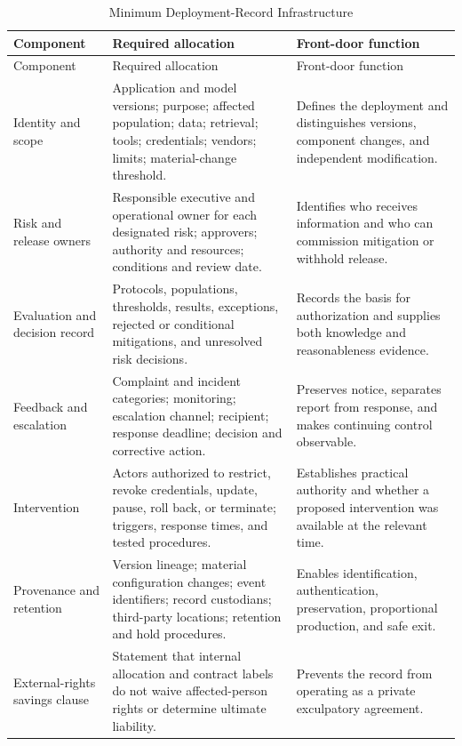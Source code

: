 \begin{longtable}{>{\raggedright\arraybackslash}p{} >{\raggedright\arraybackslash}p{} >{\raggedright\arraybackslash}p{}}
\caption{Minimum Deployment-Record Infrastructure}\label{tab:control-sheet}\\
\toprule
Component & Required allocation & Front-door function \\
\midrule
\endfirsthead
\toprule
Component & Required allocation & Front-door function \\
\midrule
\endhead
Identity and scope & Application and model versions; purpose; affected population; data; retrieval; tools; credentials; vendors; limits; material-change threshold. & Defines the deployment and distinguishes versions, component changes, and independent modification. \\
Risk and release owners & Responsible executive and operational owner for each designated risk; approvers; authority and resources; conditions and review date. & Identifies who receives information and who can commission mitigation or withhold release. \\
Evaluation and decision record & Protocols, populations, thresholds, results, exceptions, rejected or conditional mitigations, and unresolved risk decisions. & Records the basis for authorization and supplies both knowledge and reasonableness evidence. \\
Feedback and escalation & Complaint and incident categories; monitoring; escalation channel; recipient; response deadline; decision and corrective action. & Preserves notice, separates report from response, and makes continuing control observable. \\
Intervention & Actors authorized to restrict, revoke credentials, update, pause, roll back, or terminate; triggers, response times, and tested procedures. & Establishes practical authority and whether a proposed intervention was available at the relevant time. \\
Provenance and retention & Version lineage; material configuration changes; event identifiers; record custodians; third-party locations; retention and hold procedures. & Enables identification, authentication, preservation, proportional production, and safe exit. \\
External-rights savings clause & Statement that internal allocation and contract labels do not waive affected-person rights or determine ultimate liability. & Prevents the record from operating as a private exculpatory agreement. \\
\bottomrule
\end{longtable}

